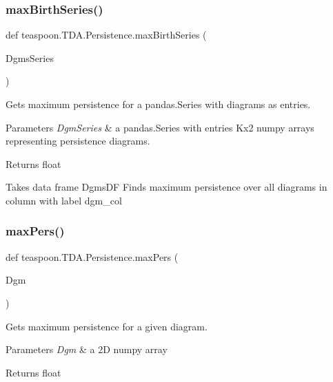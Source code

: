 \subsubsection{\texorpdfstring{max\+Birth\+Series()}{maxBirthSeries()}}
{\footnotesize\ttfamily def teaspoon.\+T\+D\+A.\+Persistence.\+max\+Birth\+Series (\begin{DoxyParamCaption}\item[{}]{Dgms\+Series }\end{DoxyParamCaption})}



Gets maximum persistence for a pandas.\+Series with diagrams as entries. 


\begin{DoxyParams}{Parameters}
{\em Dgm\+Series} & a pandas.\+Series with entries Kx2 numpy arrays representing persistence diagrams.\\
\hline
\end{DoxyParams}
\begin{DoxyReturn}{Returns}
float \begin{DoxyVerb}Takes data frame DgmsDF
Finds maximum persistence over all diagrams in
column with label dgm_col
\end{DoxyVerb}
 
\end{DoxyReturn}
\mbox{\label{namespaceteaspoon_1_1_t_d_a_1_1_persistence_aff5b752e3141736e91e1386d28b3dfd5}} 
\subsubsection{\texorpdfstring{max\+Pers()}{maxPers()}}
{\footnotesize\ttfamily def teaspoon.\+T\+D\+A.\+Persistence.\+max\+Pers (\begin{DoxyParamCaption}\item[{}]{Dgm }\end{DoxyParamCaption})}



Gets maximum persistence for a given diagram. 


\begin{DoxyParams}{Parameters}
{\em Dgm} & a 2D numpy array\\
\hline
\end{DoxyParams}
\begin{DoxyReturn}{Returns}
float 
\end{DoxyReturn}
\mbox{\label{namespaceteaspoon_1_1_t_d_a_1_1_persistence_a6413fcc8a65a5422547f264331eb5c7d}} 
